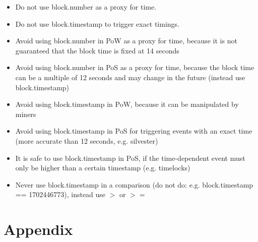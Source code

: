 \begin{itemize}
  \item Do not use block.number as a proxy for time.
  \item Do not use block.timestamp to trigger exact timings.
  \item Avoid using block.number in PoW as a proxy for time, because it is not guaranteed that the block time is fixed at 14 seconds \\
  \item Avoid using block.number in PoS as a proxy for time, because the block time can be a multiple of 12 seconds and may change in the future (instead use block.timestamp)\\
  \item Avoid using block.timestamp in PoW, because it can be manipulated by miners \\
  \item Avoid using block.timestamp in PoS for triggering events with an exact time (more accurate than 12 seconds, e.g. silvester) \\
  \item It is safe to use block.timestamp in PoS, if the time-dependent event must only be higher than a certain timestamp (e.g. timelocks) \\
  \item Never use block.timestamp in a comparison (do not do: e.g. block.timestamp == 1702446773), instead use $>$ or $>=$
\end{itemize}

\section{Appendix}
\label{appendix}








